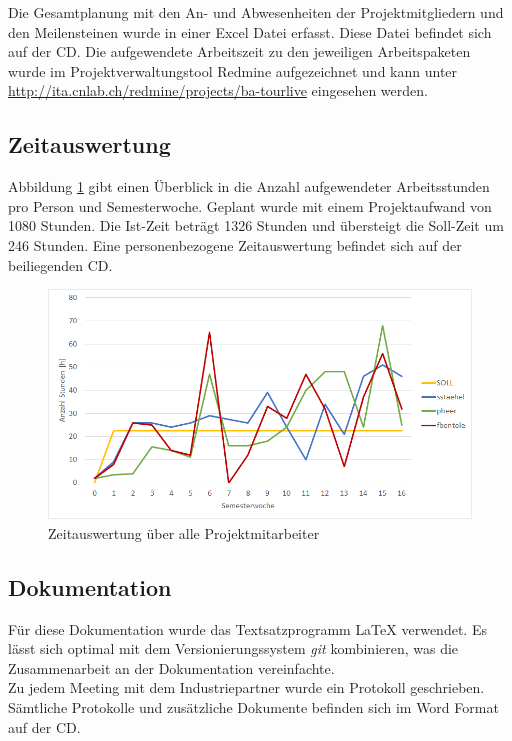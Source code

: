 Die Gesamtplanung mit den An- und Abwesenheiten der Projektmitgliedern und den Meilensteinen wurde in einer Excel Datei erfasst. Diese Datei befindet sich auf der CD. Die aufgewendete Arbeitszeit zu den jeweiligen Arbeitspaketen wurde im Projektverwaltungstool Redmine aufgezeichnet und kann unter \url{http://ita.cnlab.ch/redmine/projects/ba-tourlive} eingesehen werden.
\\
\subsection{Zeitauswertung}
Abbildung \ref{fig:zeitauswertung} gibt einen Überblick in die Anzahl aufgewendeter Arbeitsstunden pro Person und Semesterwoche. Geplant wurde mit einem Projektaufwand von 1080 Stunden. Die Ist-Zeit beträgt 1326 Stunden und übersteigt die Soll-Zeit um 246 Stunden. Eine personenbezogene Zeitauswertung befindet sich auf der beiliegenden CD.

\begin{figure}[H]
	\centering
	\includegraphics[width=140mm]{images/timereport.png}
	\caption{Zeitauswertung über alle Projektmitarbeiter}
	\label{fig:zeitauswertung}	
\end{figure}

\subsection{Dokumentation}
Für diese Dokumentation wurde das Textsatzprogramm {\LaTeX} verwendet. Es lässt sich optimal mit dem Versionierungssystem \textit{\gls{git}} kombinieren, was die Zusammenarbeit an der Dokumentation vereinfachte.
\\

Zu jedem Meeting mit dem Industriepartner wurde ein Protokoll geschrieben. Sämtliche Protokolle und zusätzliche Dokumente befinden sich im Word Format auf der CD.
